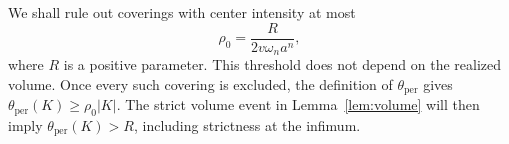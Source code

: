 We shall rule out coverings with center intensity at most
\begin{equation}\label{eq:intensity-threshold}
 \rho_0=\frac{R}{2v\omega_n a^n},
\end{equation}
where $R$ is a positive parameter. This threshold does not depend on the
realized volume. Once every such covering is excluded, the definition of
$\theta_{\mathrm{per}}$ gives $\theta_{\mathrm{per}}(K)\ge\rho_0|K|$. The strict volume event in
Lemma~\ref{lem:volume} will then imply $\theta_{\mathrm{per}}(K)>R$, including strictness
at the infimum.
